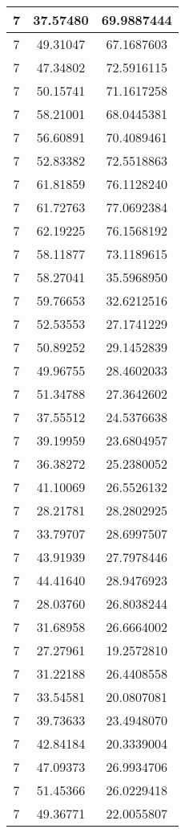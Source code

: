 \documentclass[
]{book}
\begin{document}
\begin{tabular}{c|c|c}
\hline
7 & 37.57480 & 69.9887444\\
\hline
7 & 49.31047 & 67.1687603\\
\hline
7 & 47.34802 & 72.5916115\\
\hline
7 & 50.15741 & 71.1617258\\
\hline
7 & 58.21001 & 68.0445381\\
\hline
7 & 56.60891 & 70.4089461\\
\hline
7 & 52.83382 & 72.5518863\\
\hline
7 & 61.81859 & 76.1128240\\
\hline
7 & 61.72763 & 77.0692384\\
\hline
7 & 62.19225 & 76.1568192\\
\hline
7 & 58.11877 & 73.1189615\\
\hline
7 & 58.27041 & 35.5968950\\
\hline
7 & 59.76653 & 32.6212516\\
\hline
7 & 52.53553 & 27.1741229\\
\hline
7 & 50.89252 & 29.1452839\\
\hline
7 & 49.96755 & 28.4602033\\
\hline
7 & 51.34788 & 27.3642602\\
\hline
7 & 37.55512 & 24.5376638\\
\hline
7 & 39.19959 & 23.6804957\\
\hline
7 & 36.38272 & 25.2380052\\
\hline
7 & 41.10069 & 26.5526132\\
\hline
7 & 28.21781 & 28.2802925\\
\hline
7 & 33.79707 & 28.6997507\\
\hline
7 & 43.91939 & 27.7978446\\
\hline
7 & 44.41640 & 28.9476923\\
\hline
7 & 28.03760 & 26.8038244\\
\hline
7 & 31.68958 & 26.6664002\\
\hline
7 & 27.27961 & 19.2572810\\
\hline
7 & 31.22188 & 26.4408558\\
\hline
7 & 33.54581 & 20.0807081\\
\hline
7 & 39.73633 & 23.4948070\\
\hline
7 & 42.84184 & 20.3339004\\
\hline
7 & 47.09373 & 26.9934706\\
\hline
7 & 51.45366 & 26.0229418\\
\hline
7 & 49.36771 & 22.0055807\\

\end{tabular}
\end{document}
